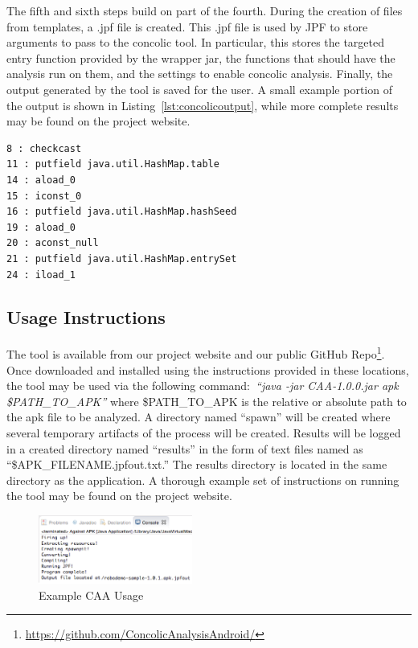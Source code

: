 \documentclass[conference]{IEEEtran}
\begin{document}
The fifth and sixth steps build on part of the fourth. During the creation of files from templates, a .jpf file is created. This .jpf file is used by JPF to store arguments to pass to the concolic tool. In particular, this stores the targeted entry function provided by the wrapper jar, the functions that should have the analysis run on them, and the settings to enable concolic analysis. Finally, the output generated by the tool is saved for the user. A small example portion of the output is shown in Listing~\ref{lst:concolicoutput}, while more complete results may be found on the project website.

\begin{lstlisting}[label=lst:concolicoutput, caption=Example Concolic Output]
8 : checkcast
11 : putfield java.util.HashMap.table
14 : aload_0
15 : iconst_0
16 : putfield java.util.HashMap.hashSeed
19 : aload_0
20 : aconst_null
21 : putfield java.util.HashMap.entrySet
24 : iload_1
\end{lstlisting}



\subsection{Usage Instructions}

The tool is available from our project website and our public GitHub Repo\footnote{\url{https://github.com/ConcolicAnalysisAndroid/}}. Once downloaded and installed using the instructions provided in these locations, the tool may be used via the following command:~\emph{``java -jar CAA-1.0.0.jar \-apk \$PATH\_TO\_APK''} where \$PATH\_TO\_APK is the relative or absolute path to the apk file to be analyzed.  A directory named ``spawn'' will be created where several temporary artifacts of the process will be created. Results will be logged in a created directory named ``results'' in the form of text files named as ``\$APK\_FILENAME.jpfout.txt.'' The results directory is located in the same directory as the application. A thorough example set of instructions on running the tool may be found on the project website.



\begin{figure}[ht!]
\centering
\includegraphics[width=0.45\textwidth]{images/CAA_Eclipse_small.png}
\caption{Example CAA Usage}
\label{fig:usingCAA}
\end{figure}
\end{document}
